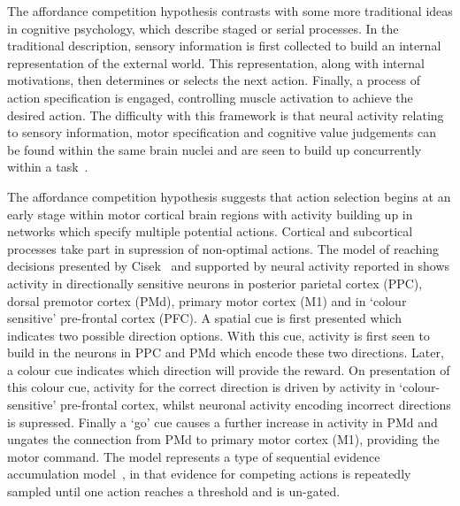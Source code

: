 \documentclass[10pt,letterpaper]{article}
\begin{document}
The affordance competition hypothesis contrasts with some more
traditional ideas in cognitive psychology, which describe staged or
serial processes. In the traditional description, sensory information
is first collected to build an internal representation of the external
world.  This representation, along with internal motivations, then
determines or selects the next action. Finally, a process of action
specification is engaged, controlling muscle activation to achieve the
desired action. The difficulty with this framework is that neural
activity relating to sensory information, motor specification and
cognitive value judgements can be found within the same brain nuclei
and are seen to build up concurrently within a
task~\cite{cisek_neural_2005,schall_neural_1993}.

The affordance competition hypothesis suggests that action selection
begins at an early stage within motor cortical brain regions with
activity building up in networks which specify multiple potential
actions. Cortical and subcortical~\cite{humphries_role_2002} processes
take part in supression of non-optimal actions. The model of reaching
decisions presented by
Cisek~\cite{cisek_cortical_2007,cisek_integrated_2006} and supported
by neural activity reported in \cite{cisek_neural_2005} shows activity
in directionally sensitive neurons in posterior parietal cortex (PPC),
dorsal premotor cortex (PMd), primary motor cortex (M1) and in `colour
sensitive' pre-frontal cortex (PFC). A spatial cue is first presented
which indicates two possible direction options. With this cue,
activity is first seen to build in the neurons in PPC and PMd which
encode these two directions. Later, a colour cue indicates which
direction will provide the reward. On presentation of this colour cue,
activity for the correct direction is driven by activity in
`colour-sensitive' pre-frontal cortex, whilst neuronal activity
encoding incorrect directions is supressed. Finally a `go' cue causes
a further increase in activity in PMd and ungates the connection from
PMd to primary motor cortex (M1), providing the motor command. The
model represents a type of sequential evidence accumulation
model~\cite{bogacz_physics_2006}, in that evidence for competing
actions is repeatedly sampled until one action reaches a threshold and
is un-gated. %
\end{document}
